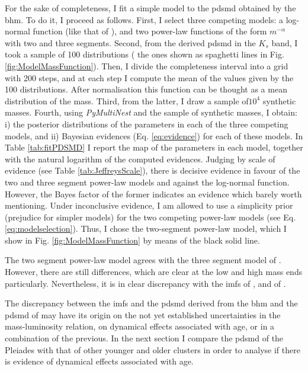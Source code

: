 For the sake of completeness, I fit a simple model to the \gls{pdsmd} obtained by the \gls{bhm}. To do it, I proceed as follows. First, I select three competing models: a log-normal function (like that of \citet{Chabrier2003b,Chabrier2005}), and two power-law functions of the form $m^{-\alpha}$ with two and three segments. Second, from the derived \gls{pdsmd} in the $K_s$ band, I took a sample of 100 distributions ( the ones shown as spaghetti lines in Fig. \ref{fig:ModelMassFunction}). Then, I divide  the completeness interval into a grid with 200 steps, and at each step I compute the mean of the values given by the 100 distributions. After normalisation this function can be thought as a mean distribution of the mass. Third, from the latter, I draw a sample of$10^4$ synthetic masses. Fourth, using \emph{PyMultiNest} \citep{Buchner2014} and the sample of synthetic masses, I obtain: i) the posterior distributions of the parameters in each of the three competing models, and ii) Bayesian evidences (Eq. \ref{eq:evidence}) for each of these models. In Table \ref{tab:fitPDSMD} I report the \gls{map} of the parameters in each model, together with the natural logarithm of the computed evidences. Judging by \citet{Jeffreys61} scale of evidence (see Table \ref{tab:JeffreysScale}), there is decisive evidence in favour of the two and three segment power-law models and against the log-normal function. However, the Bayes factor of the former indicates an evidence which barely worth mentioning. Under inconclusive evidence, I am allowed to use a simplicity prior (prejudice for simpler models) for the two competing power-law models (see Eq. \ref{eq:modelselection}). Thus, I chose the two-segment power-law model, which I show in Fig. \ref{fig:ModelMassFunction} by means of the black solid line.

The two segment power-law model agrees with the three segment model of \citet{Bouy2015}. However, there are still differences, which are clear at the low and high mass ends particularly. Nevertheless, it is in clear discrepancy with the \glspl{imf} of \citet{Chabrier2005},  \cite[$m_c=0.25_{-0.016}^{+0.021}$ and $\sigma=0.55_{-0.01}^{+0.05}$, the uncertainties are those reported by][for single objects]{Chabrier2003b} and of \citet{Thies2007}. 

The discrepancy between the \glspl{imf} and the \gls{pdsmd} derived from the \gls{bhm} and the \gls{pdsmd} of \citet{Bouy2015} may have its origin on the not yet established uncertainties in the mass-luminosity relation, on dynamical effects associated with age, or in a combination of the previous. In the next section I compare the \gls{pdsmd} of the Pleiades with that of other younger and older clusters in order to analyse if there is evidence of dynamical effects associated with age.

